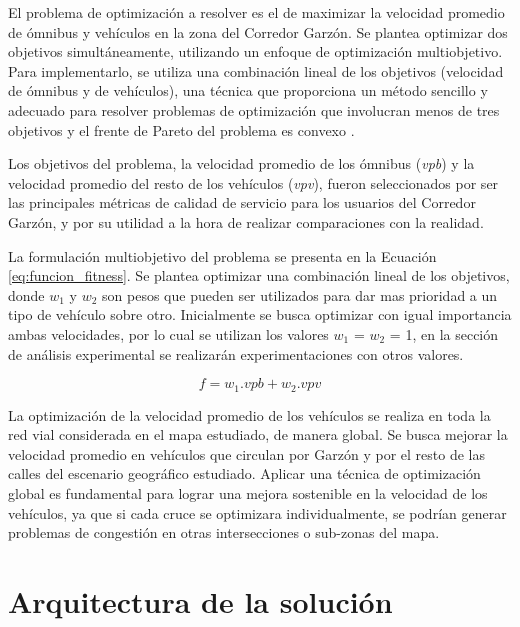 El problema de optimización a resolver es el de maximizar la velocidad promedio de ómnibus y vehículos en la zona del Corredor Garzón. Se plantea optimizar dos objetivos simultáneamente, utilizando un enfoque de optimización multiobjetivo. Para implementarlo, se utiliza una combinación lineal de los objetivos (velocidad de ómnibus y de vehículos), una técnica que proporciona un método sencillo y adecuado para resolver problemas de optimización que involucran menos de tres objetivos y el frente de Pareto del problema es convexo \citep{coello2002evolutionary}.

Los objetivos del problema, la velocidad promedio de los ómnibus (\emph{vpb}) y la velocidad promedio del resto de los vehículos (\emph{vpv}), fueron seleccionados por ser las principales métricas de calidad de servicio para los usuarios del Corredor Garzón, y por su utilidad a la hora de realizar comparaciones con la realidad.

La formulación multiobjetivo del problema se presenta en la Ecuación \ref{eq:funcion_fitness}. Se plantea optimizar una combinación lineal de los objetivos, donde \emph{$w_1$} y \emph{$w_2$} son pesos que pueden ser utilizados para dar mas prioridad a un tipo de vehículo sobre otro. Inicialmente se busca optimizar con igual importancia ambas velocidades, por lo cual se utilizan los valores $w_1$ = $w_2$ = 1, en la sección de análisis experimental se realizarán experimentaciones con otros valores.

\begin{equation}
\label{eq:funcion_fitness}
f = w_1.vpb + w_2.vpv
\end{equation}

La optimización de la velocidad promedio de los vehículos se realiza en toda la red vial considerada en el mapa estudiado, de manera global. Se busca mejorar la velocidad promedio en vehículos que circulan por Garzón y por el resto de las calles del escenario geográfico estudiado. Aplicar una técnica de optimización global es fundamental para lograr una mejora sostenible en la velocidad de los vehículos, ya que si cada cruce se optimizara individualmente, se podrían generar problemas de congestión en otras intersecciones o sub-zonas del mapa.

\section{Arquitectura de la solución}


